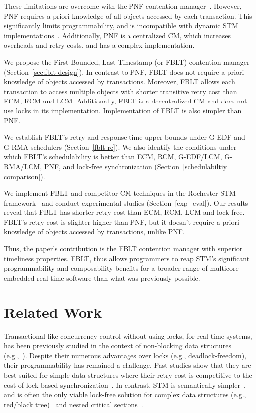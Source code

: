 \documentclass[prodmode,acmtecs]{acmsmall}
\begin{document}
These limitations are overcome with the PNF contention manager~\cite{shambake_phd_proposal}. However, PNF requires a-priori knowledge of all objects accessed by each transaction. This significantly limits programmability, and is incompatible with dynamic STM implementations~\cite{Herlihy:2003:STM:872035.872048}. Additionally, PNF is a centralized CM, which increases overheads and retry costs, and has a complex implementation. 

We propose the First Bounded, Last Timestamp (or FBLT) contention manager (Section~\ref{sec:fblt design}). In contrast to PNF, FBLT does not require a-priori knowledge of objects accessed by transactions. Moreover, FBLT allows each transaction to access multiple objects with shorter transitive retry cost than ECM, RCM and LCM. Additionally, FBLT is a decentralized CM and does not use locks in its implementation. Implementation of FBLT is also simpler than PNF. 

We establish FBLT's retry and response time upper bounds under G-EDF and G-RMA schedulers (Section~\ref{fblt rc}). We also identify the conditions under which FBLT's schedulability is better than ECM, RCM, G-EDF/LCM, G-RMA/LCM, PNF, and lock-free synchronization (Section~\ref{schedulabiltiy comparison}).

We implement FBLT and competitor CM techniques in the Rochester STM framework~\cite{marathe2006lowering} and conduct experimental studies (Section~\ref{exp_eval}). Our results reveal that FBLT has shorter retry cost than ECM, RCM, LCM and lock-free. FBLT's retry cost is slighter higher than PNF, but it doesn't require a-priori knowledge of objects accessed by transactions, unlike PNF. 

Thus, the paper's contribution is the FBLT contention manager with superior timeliness properties. FBLT, thus allows programmers to reap STM's significant programmability and composability benefits for a broader range of multicore embedded real-time software than what was previously possible.

\section{Related Work}
\label{sec:past}

Transactional-like concurrency control without using locks, for real-time systems, has been previously studied in the context of non-blocking data structures (e.g.,~\cite{anderson95realtime}). Despite their numerous advantages over locks 
(e.g., deadlock-freedom), 
their programmability has remained a challenge. 
Past studies show that they are best suited for simple data structures where their retry cost is competitive to the cost of lock-based synchronization~\cite{bc+08}.  In contrast, STM is semantically simpler~\cite{Herlihy:2006:AMP:1146381.1146382}, and is often the only viable lock-free solution for complex data structures (e.g., red/black tree)~\cite{key-1} and nested critical sections~\cite{Saha:2006:MHP:1122971.1123001}.
\end{document}
